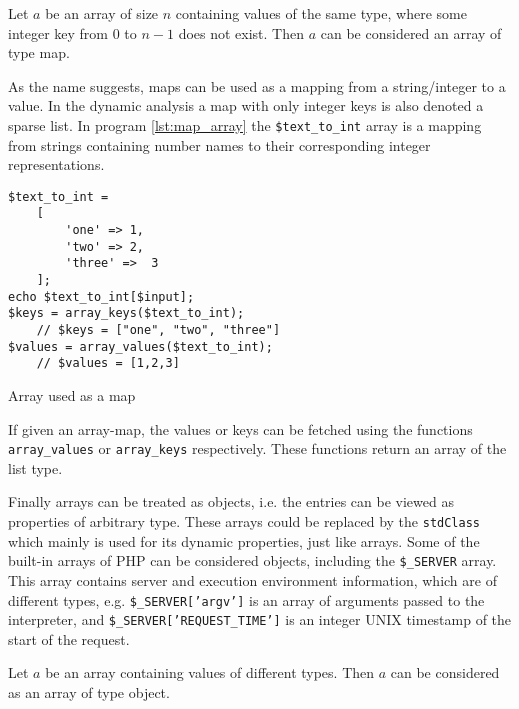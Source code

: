 \begin{definition}
\label{def:map}
Let $a$ be an array of size $n$ containing values of the same type, where some integer key from 0 to $n-1$ does not exist. Then $a$ can be considered an array of type map.
\end{definition}

As the name suggests, maps can be used as a mapping from a string/integer to a value. In the dynamic analysis a map with only integer keys is also denoted a sparse list. In program \ref{lst:map_array} the \texttt{\$text\_to\_int} array is a mapping from strings containing number names to their corresponding integer representations. 

\begin{program}[ht]
\begin{lstlisting}
$text_to_int = 
    [ 
        'one' => 1,
        'two' => 2,
        'three' =>  3
    ];
echo $text_to_int[$input]; 
$keys = array_keys($text_to_int);
    // $keys = ["one", "two", "three"]
$values = array_values($text_to_int);
    // $values = [1,2,3]
\end{lstlisting}
\caption{Array used as a map}
\label{lst:map_array}
\end{program}

If given an array-map, the values or keys can be fetched using the functions \texttt{array\_values} or \texttt{array\_keys} respectively. These functions return an array of the list type. 

Finally arrays can be treated as objects, i.e. the entries can be viewed as properties of arbitrary type. These arrays could be replaced by the \texttt{stdClass} which mainly is used for its dynamic properties, just like arrays. Some of the built-in arrays of PHP can be considered objects, including the \texttt{\$\_SERVER} array. This array contains server and execution environment information, which are of different types, e.g. \texttt{\$\_SERVER['argv']} is an array of arguments passed to the interpreter, and \texttt{\$\_SERVER['REQUEST\_TIME']} is an integer UNIX timestamp of the start of the request. 

\begin{definition}
\label{def:object}
Let $a$ be an array containing values of different types. Then $a$ can be considered as an array of type object.
\end{definition}


